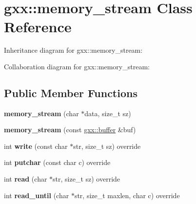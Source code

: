 \hypertarget{classgxx_1_1memory__stream}{}\section{gxx\+:\+:memory\+\_\+stream Class Reference}
\label{classgxx_1_1memory__stream}


Inheritance diagram for gxx\+:\+:memory\+\_\+stream\+:


Collaboration diagram for gxx\+:\+:memory\+\_\+stream\+:
\subsection*{Public Member Functions}
\begin{DoxyCompactItemize}
\item 
{\bfseries memory\+\_\+stream} (char $\ast$data, size\+\_\+t sz)\hypertarget{classgxx_1_1memory__stream_a49a6e0be5744c7373d999beabc69b44b}{}\label{classgxx_1_1memory__stream_a49a6e0be5744c7373d999beabc69b44b}

\item 
{\bfseries memory\+\_\+stream} (const \hyperlink{classgxx_1_1buffer}{gxx\+::buffer} \&buf)\hypertarget{classgxx_1_1memory__stream_aaee5560d8e0e11ff24a77ba9a217ae1c}{}\label{classgxx_1_1memory__stream_aaee5560d8e0e11ff24a77ba9a217ae1c}

\item 
int {\bfseries write} (const char $\ast$str, size\+\_\+t sz) override\hypertarget{classgxx_1_1memory__stream_a38b90bbecf965860615f8a6fdc3e6961}{}\label{classgxx_1_1memory__stream_a38b90bbecf965860615f8a6fdc3e6961}

\item 
int {\bfseries putchar} (const char c) override\hypertarget{classgxx_1_1memory__stream_a55c81dee9f8057cf653bb336edd02969}{}\label{classgxx_1_1memory__stream_a55c81dee9f8057cf653bb336edd02969}

\item 
int {\bfseries read} (char $\ast$str, size\+\_\+t sz) override\hypertarget{classgxx_1_1memory__stream_aa018be361ae359bf88a706533b81be3d}{}\label{classgxx_1_1memory__stream_aa018be361ae359bf88a706533b81be3d}

\item 
int {\bfseries read\+\_\+until} (char $\ast$str, size\+\_\+t maxlen, char c) override\hypertarget{classgxx_1_1memory__stream_a0794a4482c1ba6ffdf062828bf391b64}{}\label{classgxx_1_1memory__stream_a0794a4482c1ba6ffdf062828bf391b64}


\end{DoxyCompactItemize}
